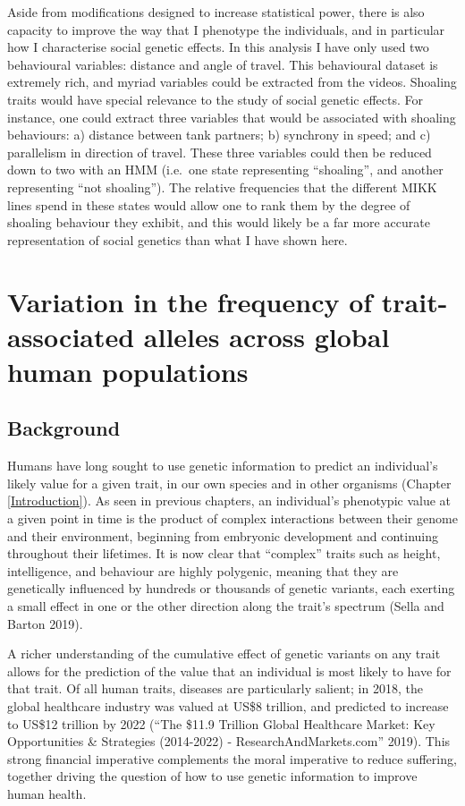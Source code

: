 \documentclass[
]{book}
\begin{document}
Aside from modifications designed to increase statistical power, there is also capacity to improve the way that I phenotype the individuals, and in particular how I characterise social genetic effects. In this analysis I have only used two behavioural variables: distance and angle of travel. This behavioural dataset is extremely rich, and myriad variables could be extracted from the videos. Shoaling traits would have special relevance to the study of social genetic effects. For instance, one could extract three variables that would be associated with shoaling behaviours: a) distance between tank partners; b) synchrony in speed; and c) parallelism in direction of travel. These three variables could then be reduced down to two with an HMM (i.e.~one state representing ``shoaling'', and another representing ``not shoaling''). The relative frequencies that the different MIKK lines spend in these states would allow one to rank them by the degree of shoaling behaviour they exhibit, and this would likely be a far more accurate representation of social genetics than what I have shown here.

\hypertarget{Fst-chap}{%
\chapter{Variation in the frequency of trait-associated alleles across global human populations}\label{Fst-chap}}

\hypertarget{Fst-background}{%
\section{Background}\label{Fst-background}}

Humans have long sought to use genetic information to predict an individual's likely value for a given trait, in our own species and in other organisms (Chapter \ref{Introduction}). As seen in previous chapters, an individual's phenotypic value at a given point in time is the product of complex interactions between their genome and their environment, beginning from embryonic development and continuing throughout their lifetimes. It is now clear that ``complex'' traits such as height, intelligence, and behaviour are highly polygenic, meaning that they are genetically influenced by hundreds or thousands of genetic variants, each exerting a small effect in one or the other direction along the trait's spectrum (Sella and Barton 2019).

A richer understanding of the cumulative effect of genetic variants on any trait allows for the prediction of the value that an individual is most likely to have for that trait. Of all human traits, diseases are particularly salient; in 2018, the global healthcare industry was valued at US\$8 trillion, and predicted to increase to US\$12 trillion by 2022 ({``The \$11.9 {Trillion Global Healthcare Market}: {Key Opportunities} \& {Strategies} (2014-2022) - {ResearchAndMarkets}.com''} 2019). This strong financial imperative complements the moral imperative to reduce suffering, together driving the question of how to use genetic information to improve human health.
\end{document}
